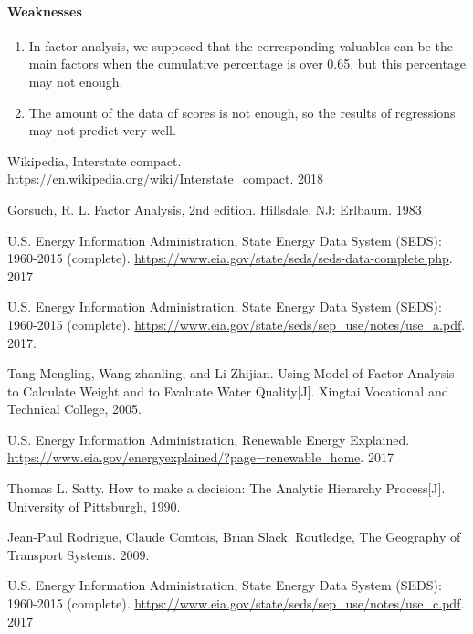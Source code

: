 \documentclass[a4paper,11pt]{article}
\begin{document}
\paragraph{Weaknesses}
\begin{enumerate}%
\renewcommand{\labelenumi}{(\theenumi)}
    \item In factor analysis, we supposed that the corresponding valuables can be the main factors when the cumulative percentage is over 0.65, but this percentage may not enough.
    \item The amount of the data of scores is not enough, so the results of regressions may not predict very well.
\end{enumerate}





\begin{thebibliography}{}

%
Wikipedia, Interstate compact. \url{https://en.wikipedia.org/wiki/Interstate_compact}. 2018

Gorsuch, R. L. Factor Analysis, 2nd edition. Hillsdale, NJ: Erlbaum. 1983

U.S. Energy Information Administration, State Energy Data System (SEDS): 1960-2015 (complete). \url{https://www.eia.gov/state/seds/seds-data-complete.php}. 2017

U.S. Energy Information Administration, State Energy Data System (SEDS): 1960-2015 (complete). \url{https://www.eia.gov/state/seds/sep_use/notes/use_a.pdf}. 2017.

Tang Mengling, Wang zhanling, and Li Zhijian. Using Model of Factor Analysis to Calculate Weight and to Evaluate Water Quality[J]. Xingtai Vocational and Technical College, 2005.

U.S. Energy Information Administration, Renewable Energy Explained. \url{https://www.eia.gov/energyexplained/?page=renewable_home}. 2017


Thomas L. Satty. How to make a decision: The Analytic Hierarchy Process[J]. University of Pittsburgh, 1990.

Jean-Paul Rodrigue, Claude Comtois, Brian Slack. Routledge, The Geography of Transport Systems. 2009.

U.S. Energy Information Administration, State Energy Data System (SEDS): 1960-2015 (complete). \url{https://www.eia.gov/state/seds/sep_use/notes/use_c.pdf}. 2017


\end{thebibliography}
\end{document}
